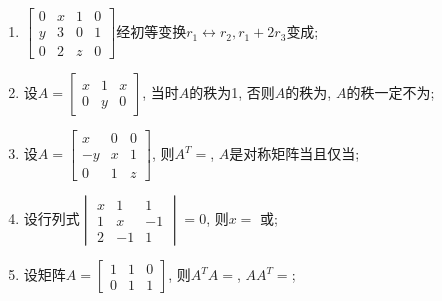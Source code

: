 \documentclass[12pt,a4paper]{ctexart}%
\begin{document}
\begin{enumerate}[1)]%

\item%
$\begin{bmatrix}
0 & x & 1 & 0\\
y & 3 & 0 & 1\\
0 & 2 & z & 0
\end{bmatrix}
$经初等变换$r_1\leftrightarrow r_2, r_1 + 2r_3$变成;%
\item%
设$A=\begin{bmatrix}
x & 1 & x\\
0 & y & 0
\end{bmatrix}
$, 当时$A$的秩为1, 否则$A$的秩为, $A$的秩一定不为;%
\item%
设$A=\begin{bmatrix}
x& 0 & 0 \\
-y& x & 1 \\
0 & 1 & z
\end{bmatrix}
$, 则$A^T=$, $A$是对称矩阵当且仅当;%
\item%
设行列式$\begin{vmatrix}
x & 1 & 1 \\
1 & x & -1 \\
2 & -1 & 1
\end{vmatrix}
=0$, 则$x=$ 或;%

\item%
设矩阵$A=\begin{bmatrix}
1 & 1 & 0\\
0 & 1 & 1
\end{bmatrix}
$, 则$A^TA=$, $AA^T=$;%
\end{enumerate}%
\end{document}
